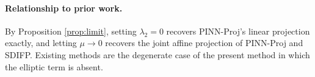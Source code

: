 \documentclass[11pt,a4paper]{article}
\theoremstyle{remark}
\begin{document}
\paragraph{Relationship to prior work.}
By Proposition \ref{prop:limit}, setting $\lambda_2 = 0$ recovers PINN-Proj's
linear projection exactly, and letting $\mu\to0$ recovers the joint affine
projection of PINN-Proj and SDIFP. Existing methods are the degenerate case of
the present method in which the elliptic term is absent.
\end{document}
